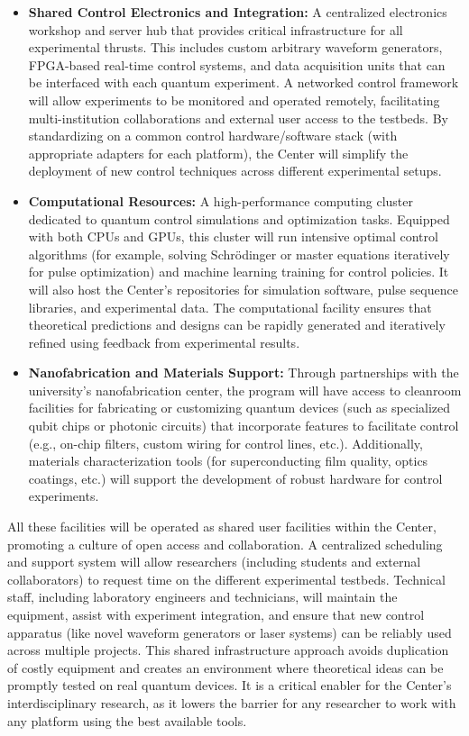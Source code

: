 \documentclass[11pt]{article}
\begin{document}
\begin{itemize}
   \item \textbf{Shared Control Electronics and Integration:} A centralized electronics workshop and server hub that provides critical infrastructure for all experimental thrusts. This includes custom arbitrary waveform generators, FPGA-based real-time control systems, and data acquisition units that can be interfaced with each quantum experiment. A networked control framework will allow experiments to be monitored and operated remotely, facilitating multi-institution collaborations and external user access to the testbeds. By standardizing on a common control hardware/software stack (with appropriate adapters for each platform), the Center will simplify the deployment of new control techniques across different experimental setups.
   \item \textbf{Computational Resources:} A high-performance computing cluster dedicated to quantum control simulations and optimization tasks. Equipped with both CPUs and GPUs, this cluster will run intensive optimal control algorithms (for example, solving Schr\"odinger or master equations iteratively for pulse optimization) and machine learning training for control policies. It will also host the Center's repositories for simulation software, pulse sequence libraries, and experimental data. The computational facility ensures that theoretical predictions and designs can be rapidly generated and iteratively refined using feedback from experimental results.
   \item \textbf{Nanofabrication and Materials Support:} Through partnerships with the university's nanofabrication center, the program will have access to cleanroom facilities for fabricating or customizing quantum devices (such as specialized qubit chips or photonic circuits) that incorporate features to facilitate control (e.g., on-chip filters, custom wiring for control lines, etc.). Additionally, materials characterization tools (for superconducting film quality, optics coatings, etc.) will support the development of robust hardware for control experiments.
\end{itemize}

All these facilities will be operated as shared user facilities within the Center, promoting a culture of open access and collaboration. A centralized scheduling and support system will allow researchers (including students and external collaborators) to request time on the different experimental testbeds. Technical staff, including laboratory engineers and technicians, will maintain the equipment, assist with experiment integration, and ensure that new control apparatus (like novel waveform generators or laser systems) can be reliably used across multiple projects. This shared infrastructure approach avoids duplication of costly equipment and creates an environment where theoretical ideas can be promptly tested on real quantum devices. It is a critical enabler for the Center's interdisciplinary research, as it lowers the barrier for any researcher to work with any platform using the best available tools.
\end{document}
